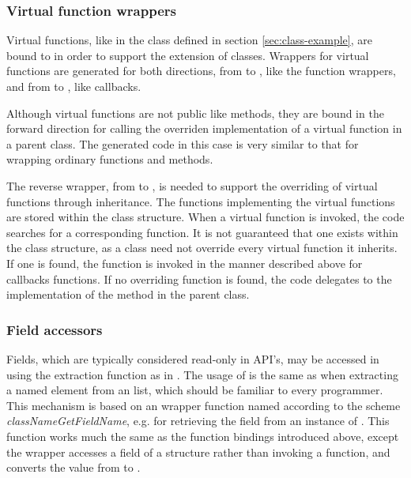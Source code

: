 \documentclass[article,shortnames]{jss}
\begin{document}


\subsubsection{Virtual function wrappers}
Virtual functions, like  in the
 class defined in section
\ref{sec:class-example}, are bound to  in order to support
the extension of  classes. Wrappers for virtual functions
are generated for both directions, from  to ,
like the function wrappers, and from  to ,
like callbacks. 

Although virtual functions are not public like methods, they are bound
in the forward direction for calling the overriden implementation of a
virtual function in a parent class.  The generated code in this case
is very similar to that for wrapping ordinary functions and methods.

The reverse wrapper, from  to , is needed to
support the overriding of virtual functions through inheritance. The
 functions implementing the virtual functions are stored
within the  class structure. When a virtual function is
invoked, the code searches for a corresponding  function.
It is not guaranteed that one exists within the class structure, as a
class need not override every virtual function it inherits. If one is
found, the  function is invoked in the manner described
above for callbacks functions. If no overriding function is found, the
code delegates to the implementation of the method in the parent
class.

\subsubsection{Field accessors}

Fields, which are typically considered read-only in
 API's, may be accessed in  using the
extraction function \code{[[} as in . The usage of
\code{[[} is the same as when extracting a named element from an
 list, which should be familiar to every
 programmer. 
This mechanism is based on an 
wrapper function named according to the scheme
\emph{classNameGetFieldName}, e.g.  for
retrieving the  field from an instance of
. %
This function works much the same as the function bindings introduced
above, except the  wrapper accesses a field of a
 structure rather than invoking a function, and converts
the value from  to .
\end{document}
